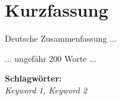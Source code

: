 
\section*{Kurzfassung}
\vspace{0.5cm}

Deutsche Zusammenfassung ...

... ungefähr 200 Worte ...

\textbf{Schlagwörter:}\\
\textit{Keyword 1, Keyword 2}


